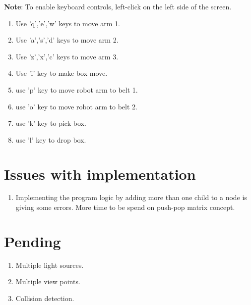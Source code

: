 \documentclass[11pt]{article}
\begin{document}
\textbf{Note}: To enable keyboard controls, left-click on the left side of the screen.

\begin {enumerate}

\item Use 'q','e','w' keys to move arm 1.
\item Use 'a','s','d' keys to move arm 2.
\item Use 'z','x','c' keys to move arm 3.
\item Use 'i' key to make box move.
\item use 'p' key to move robot arm to belt 1.
\item use 'o' key to move robot arm to belt 2.
\item use 'k' key to pick box.
\item use 'l' key to drop box.

\end {enumerate}

\section{ Issues with implementation}

\begin {enumerate}
\item Implementing the program logic by adding more than one child to a node is giving some errors. More time to be spend on push-pop matrix concept.

\end {enumerate}             

\section{ Pending}

\begin {enumerate}
\item Multiple light sources.
\item Multiple view points.
\item Collision detection.
\end {enumerate}   
\end{document}
